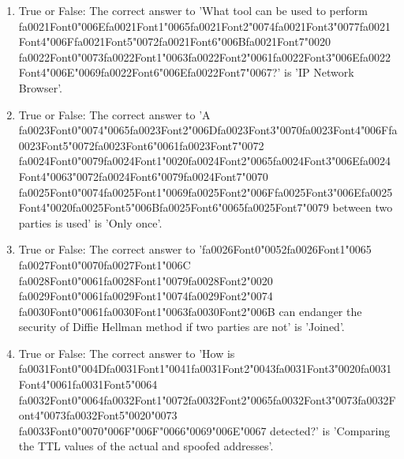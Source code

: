 \documentclass[12pt]{article}
\begin{document}
\begin{enumerate}[label=\arabic*.]
\item True or False: The correct answer to 'What tool can be used to perform {\csname fa0021Font0\endcsname\char"006E}{\csname fa0021Font1\endcsname\char"0065}{\csname fa0021Font2\endcsname\char"0074}{\csname fa0021Font3\endcsname\char"0077}{\csname fa0021Font4\endcsname\char"006F}{\csname fa0021Font5\endcsname\char"0072}{\csname fa0021Font6\endcsname\char"006B}{\csname fa0021Font7\endcsname\char"0020} {\csname fa0022Font0\endcsname\char"0073}{\csname fa0022Font1\endcsname\char"0063}{\csname fa0022Font2\endcsname\char"0061}{\csname fa0022Font3\endcsname\char"006E}{\csname fa0022Font4\endcsname\char"006E}{\char"0069}{\csname fa0022Font6\endcsname\char"006E}{\csname fa0022Font7\endcsname\char"0067}?' is 'IP Network Browser'.
\item True or False: The correct answer to 'A {\csname fa0023Font0\endcsname\char"0074}{\char"0065}{\csname fa0023Font2\endcsname\char"006D}{\csname fa0023Font3\endcsname\char"0070}{\csname fa0023Font4\endcsname\char"006F}{\csname fa0023Font5\endcsname\char"0072}{\csname fa0023Font6\endcsname\char"0061}{\csname fa0023Font7\endcsname\char"0072} {\csname fa0024Font0\endcsname\char"0079}{\csname fa0024Font1\endcsname\char"0020}{\csname fa0024Font2\endcsname\char"0065}{\csname fa0024Font3\endcsname\char"006E}{\csname fa0024Font4\endcsname\char"0063}{\char"0072}{\csname fa0024Font6\endcsname\char"0079}{\csname fa0024Font7\endcsname\char"0070} {\csname fa0025Font0\endcsname\char"0074}{\csname fa0025Font1\endcsname\char"0069}{\csname fa0025Font2\endcsname\char"006F}{\csname fa0025Font3\endcsname\char"006E}{\csname fa0025Font4\endcsname\char"0020}{\csname fa0025Font5\endcsname\char"006B}{\csname fa0025Font6\endcsname\char"0065}{\csname fa0025Font7\endcsname\char"0079} between two parties is used' is 'Only once'.
\item True or False: The correct answer to '{\csname fa0026Font0\endcsname\char"0052}{\csname fa0026Font1\endcsname\char"0065} {\csname fa0027Font0\endcsname\char"0070}{\csname fa0027Font1\endcsname\char"006C} {\csname fa0028Font0\endcsname\char"0061}{\csname fa0028Font1\endcsname\char"0079}{\csname fa0028Font2\endcsname\char"0020} {\csname fa0029Font0\endcsname\char"0061}{\csname fa0029Font1\endcsname\char"0074}{\csname fa0029Font2\endcsname\char"0074} {\csname fa0030Font0\endcsname\char"0061}{\csname fa0030Font1\endcsname\char"0063}{\csname fa0030Font2\endcsname\char"006B} can endanger the security of Diffie Hellman method if two parties are not' is 'Joined'.
\item True or False: The correct answer to 'How is {\csname fa0031Font0\endcsname\char"004D}{\csname fa0031Font1\endcsname\char"0041}{\csname fa0031Font2\endcsname\char"0043}{\csname fa0031Font3\endcsname\char"0020}{\csname fa0031Font4\endcsname\char"0061}{\csname fa0031Font5\endcsname\char"0064} {\csname fa0032Font0\endcsname\char"0064}{\csname fa0032Font1\endcsname\char"0072}{\csname fa0032Font2\endcsname\char"0065}{\csname fa0032Font3\endcsname\char"0073}{\csname fa0032Font4\endcsname\char"0073}{\csname fa0032Font5\endcsname\char"0020}{\char"0073} {\csname fa0033Font0\endcsname\char"0070}{\char"006F}{\char"006F}{\char"0066}{\char"0069}{\char"006E}{\char"0067} detected?' is 'Comparing the TTL values of the actual and spoofed addresses'.

\end{enumerate}
\end{document}
